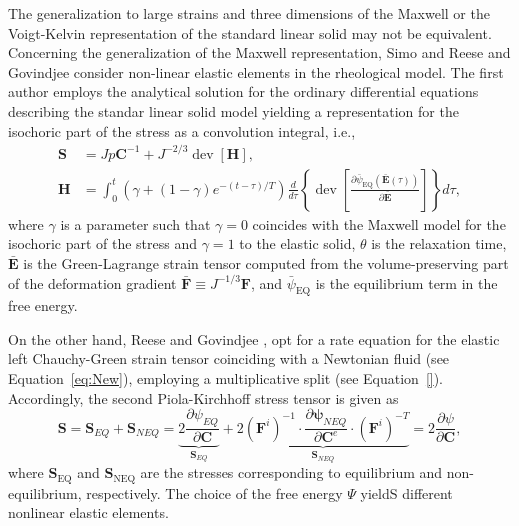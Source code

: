 The generalization to large strains and three dimensions of the Maxwell or the Voigt-Kelvin representation of the standard linear solid may not be equivalent.
Concerning the generalization of the Maxwell representation, Simo \citep{simoFullyThreedimensionalFinitestrain1987} and Reese and Govindjee \citep{reeseTheoryFiniteViscoelasticity1998} consider non-linear elastic elements in the rheological model.
The first author employs the analytical solution for the ordinary differential equations describing the standar linear solid model yielding a representation for the isochoric part of the stress as a convolution integral, i.e.,
\begin{align}
	\mathbf S &= Jp\mathbf C^{-1} + J^{-2/3}\operatorname{dev}[\mathbf H],\\
	\mathbf H &= \int_0^t (\gamma + (1-\gamma)e^{-(t-\tau)/T}) \frac{d}{d\tau}\left\{\operatorname{dev} \left[\frac{\partial {\bar\psi}_\text{EQ}(\bar{\mathbf E}(\tau))}{\partial \bar{\mathbf E}}\right]\right\}  d\tau,
\end{align}
where $\gamma$ is a parameter such that $\gamma=0$ coincides with the Maxwell model for the isochoric part of the stress and $\gamma=1$ to the elastic solid, $\theta$ is the relaxation time, $\bar{\bm E}$ is the Green-Lagrange strain tensor computed from the volume-preserving part of the deformation gradient $\bar{\bm F} \equiv J^{-1/3} \bm F$, and $\bar{\psi	}_\text{EQ}$ is the equilibrium term in the free energy.

On the other hand, Reese and Govindjee \citep{reeseTheoryFiniteViscoelasticity1998}, opt for a rate equation for the elastic left Chauchy-Green strain tensor coinciding with a Newtonian fluid (see Equation~\eqref{eq:New}), employing a multiplicative split (see Equation~\eqref{}).
Accordingly, the second Piola-Kirchhoff stress tensor is given as
\begin{equation}
	\mathbf{S}=\mathbf{S}_{E Q}+\mathbf{S}_{N E Q}=\underbrace{2 \frac{\partial \psi_{E Q}}{\partial \mathbf{C}}}_{\mathbf{S}_{E Q}}+\underbrace{2 (\mathbf{F}^i)^{-1} \cdot \frac{\partial \mathbf{\psi}_{N E Q}}{\partial \mathbf{C}^e} \cdot (\mathbf{F}^i)^{-T}}_{\mathbf{S}_{N E Q}}=2 \frac{\partial \psi}{\partial \mathbf{C}},
\end{equation}
where $\mathbf S_\text{EQ}$ and $\mathbf S_\text{NEQ}$ are the stresses corresponding to equilibrium and non-equilibrium, respectively.
The choice of the free energy $\Psi$ yieldS different nonlinear elastic elements.

